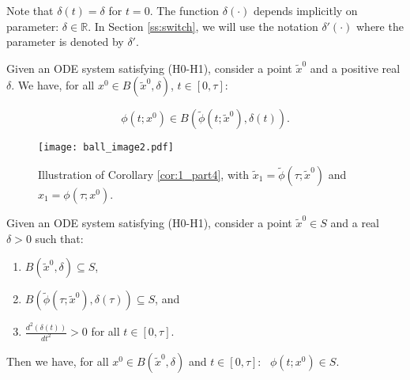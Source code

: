 Note that $\delta(t)=\delta$ for $t=0$.
The function $\delta(\cdot)$ depends implicitly on parameter: $\delta\in\mathbb{R}$. In Section \ref{ss:switch}, we will use the notation $\delta'(\cdot)$
where the parameter is denoted by $\delta'$.


\begin{theorem}\label{th:1_part4}

Given
an ODE system satisfying (H0-H1), consider
a point $\tilde{x}^0$
and a positive real $\delta$.
We have,
for all $x^0\in B(\tilde{x}^0,\delta)$, $t\in [0,\tau]$:

$$\phi(t;x^0)\in B(\tilde{\phi}(t;\tilde{x}^0),\delta(t)).$$
\end{theorem}

\begin{figure}[t]
  \centering
    \texttt{[image: ball\_image2.pdf]}
  \caption{Illustration of Corollary \ref{cor:1_part4}, with $\tilde x_1 = \tilde{\phi}(\tau;\tilde{x}^0)$
    and $x_1 = {\phi}(\tau;{x}^0)$.}
  \label{fig:control_switch}
\end{figure}


\begin{corollary}\label{cor:1_part4}

Given an ODE system %
satisfying (H0-H1), consider
a point $\tilde{x}^0\in S$ and a real $\delta>0$ such that:
\begin{enumerate}
\item $B(\tilde{x}^0,\delta)\subseteq S$,
\item $B(\tilde{\phi}(\tau;\tilde{x}^0),\delta(\tau))\subseteq S$, and
\item $\frac{d^2(\delta(t))}{dt^2}>0$ for all $t\in [0,\tau]$.
\end{enumerate}
Then we have, for all $x^0\in B(\tilde{x}^0,\delta)$ and $t\in[0,\tau]$:\
%
$\phi(t;x^0)\in S$.


\end{corollary}
